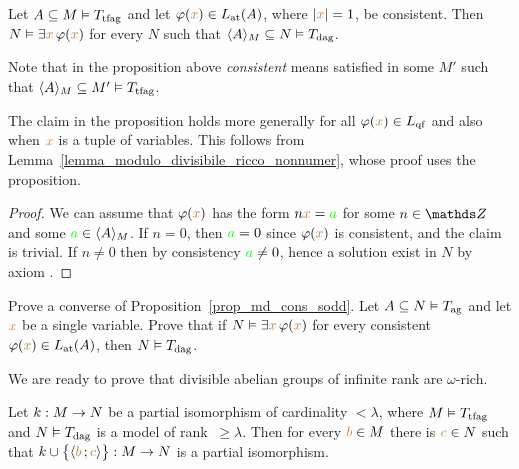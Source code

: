 \begin{proposition}\label{prop_md_cons_sodd}
Let $A\subseteq M\models T_{\rm tfag}$ and let $\phi({\mr x})\in L_{\rm at}(A)$, where $|{\mr x}|=1$, be consistent.
%
Then $N\models\E {\mr x} \,\phi({\mr x})$ for every $N$ such that $\<A\>_M\subseteq N\models T_{\rm dag}$.
\end{proposition}

Note that in the proposition above  \textit{consistent\/} means satisfied in some $M'$ such that $\<A\>_M\subseteq M'\models T_{\rm tfag}$.

The claim in the proposition holds more generally for all $\phi({\mr x})\in L_{\rm qf}$ and also when ${\mr x}$ is a tuple of variables.
%
This follows from Lemma~\ref{lemma_modulo_divisibile_ricco_nonnumer}, whose proof uses the proposition.

\begin{proof}
We can assume that $\phi({\mr x})$ has the form $n {\mr x}= {\gr a}$ for some $n\in\ZZ$ and some ${\gr a}\in\<A\>_M$.
%
If $n=0$, then ${\gr a}=0$ since $\phi({\mr x})$ is consistent, and the claim is trivial.
%
If $n\neq0$ then by consistency ${\gr a}\neq0$, hence a solution exist in $N$ by axiom .
\end{proof}

\begin{exercise}
Prove a converse of Proposition~\ref{prop_md_cons_sodd}.
%
Let $A\subseteq N\models T_{\rm ag}$ and let ${\mr x}$ be a single variable.
%
Prove that if $N\models\E{\mr x} \,\phi({\mr x})$ for every consistent $\phi({\mr x})\in L_{\rm at}(A)$, then $N\models T_{\rm dag}$.
\end{exercise}

We are ready to prove that divisible abelian groups of infinite rank are $\omega$-rich.

\begin{lemma}\label{lemma_modulo_divisibile_ricco_nonnumer}
Let $k:M\imp N$ be a partial isomorphism of cardinality $<\lambda$, where $M\models T_{\rm tfag}$ and $N\models T_{\rm dag}$ is a model of rank $\ \ge\lambda$.
%
Then for every ${\mr b}\in M$ there is ${\mr c}\in N$ such that $k\cup\big\{\<{\mr b}\,;{\mr c}\>\big\}:M\imp N$ is a partial isomorphism.
\end{lemma}

